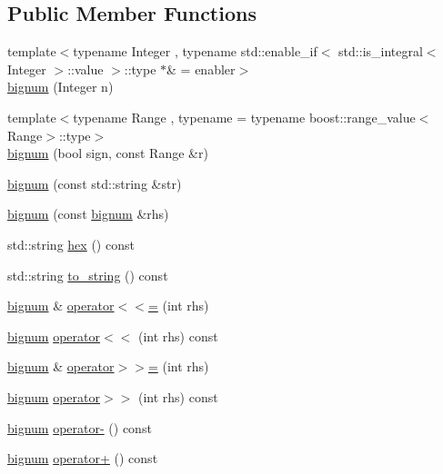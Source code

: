 \subsection*{\-Public \-Member \-Functions}
\begin{DoxyCompactItemize}
\item 
{\footnotesize template$<$typename Integer , typename std\-::enable\-\_\-if$<$ std\-::is\-\_\-integral$<$ Integer $>$\-::value $>$\-::type $\ast$\&  = enabler$>$ }\\\hyperlink{classyuh_1_1bignum_a3554dd27e1fe3080ba13d1d00027ad10}{bignum} (\-Integer n)
\item 
{\footnotesize template$<$typename Range , typename  = typename boost\-::range\-\_\-value$<$\-Range$>$\-::type$>$ }\\\hyperlink{classyuh_1_1bignum_ad2eacd50d8b775d6282ac9351caf6de7}{bignum} (bool sign, const \-Range \&r)
\item 
\hyperlink{classyuh_1_1bignum_a77569117e90017e1321762d1aeea9b2d}{bignum} (const std\-::string \&str)
\item 
\hyperlink{classyuh_1_1bignum_a3a59b58aa80ba093158db51368576cf6}{bignum} (const \hyperlink{classyuh_1_1bignum}{bignum} \&rhs)
\item 
std\-::string \hyperlink{classyuh_1_1bignum_a997e0898c1383045eb31a48897167be7}{hex} () const 
\item 
std\-::string \hyperlink{classyuh_1_1bignum_aa48c39f92bc04eded742f5310c74aafe}{to\-\_\-string} () const 
\item 
\hyperlink{classyuh_1_1bignum}{bignum} \& \hyperlink{classyuh_1_1bignum_a94b78c9c2332ec544c9762dc6d1dde34}{operator$<$$<$=} (int rhs)
\item 
\hyperlink{classyuh_1_1bignum}{bignum} \hyperlink{classyuh_1_1bignum_a5db6aaaa47216a6f79dfbcc5b7220763}{operator$<$$<$} (int rhs) const 
\item 
\hyperlink{classyuh_1_1bignum}{bignum} \& \hyperlink{classyuh_1_1bignum_a9f1e31abd2b4c1cab7753316e8257789}{operator$>$$>$=} (int rhs)
\item 
\hyperlink{classyuh_1_1bignum}{bignum} \hyperlink{classyuh_1_1bignum_a8cc3991be4b4f038754d4c6fb2e91224}{operator$>$$>$} (int rhs) const 
\item 
\hyperlink{classyuh_1_1bignum}{bignum} \hyperlink{classyuh_1_1bignum_abba394358fb666e0cb639e6c8e56cca0}{operator-\/} () const 
\item 
\hyperlink{classyuh_1_1bignum}{bignum} \hyperlink{classyuh_1_1bignum_a7f7a8b06fdb52877ad5069639753c17f}{operator+} () const 

\end{DoxyCompactItemize}

